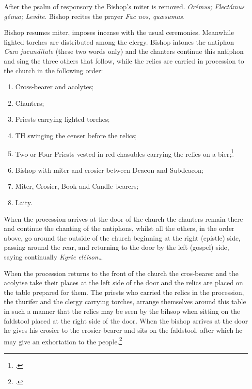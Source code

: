 \documentclass[letterpaper]{report}
\newcommand\src{\textsc{s.r.c.}}
\begin{document}
{\rubric After the psalm of responsory the Bishop's miter is removed. \textit{Orémus;
Flectámus génua; Leváte.} Bishop recites the prayer \textit{Fac nos, qu\ae sumus.}

\rubric Bishop resumes miter, imposes incense with the usual ceremonies.
Meanwhile lighted torches are distributed among the clergy. Bishop intones the
antiphon \textit{Cum jucunditate} (these two words only) and the chanters
continue this antiphon and sing the three others that follow, while the relics
are carried in procession to the church in the following order:

\begin{enumerate}
    \item Cross-bearer and acolytes;
    \item Chanters;
    \item Priests carrying lighted torches;
    \item TH swinging the censer before the relics;
    \item Two or Four Priests vested in red chasubles carrying the relics on a
        bier;\footcite[Instead of these priets the consecrator may carry the
        relics on s salver.][footnote 1, p. 81.]{consecranda}
    \item Bishop with miter and crosier between Deacon and Subdeacon;
    \item Miter, Crosier, Book and Candle bearers;
    \item Laity.
\end{enumerate}

When the procession arrives at the door of the church the chanters remain there
and continue the chanting of the antiphons, whilst all the others, in the order
above, go around the outside of the church beginning at the right (epistle)
side, passing around the rear, and returning to the door by the left (gospel)
side, saying continually \textit{Kyrie eléison\dots}

\rubric When the procession returns to the front of the church the cros-bearer
and the acolytse take their places at the left side of the door and the relics
are placed on the table prepared for them. The priests who carried the relics
in the procession, the thurifer and the clergy carrying torches, arrange
themselves around this table in such a manner that the relics may be seen by
the bihsop when sitting on the faldstool placed at the right side of the door.
When the bishop arrives at the door he gives his crosier to the crosier-bearer
and sits on the faldstool, after which he may give an exhortation to the
people.\footcite[The exhortation here spoken of, the decrees of the Council of
Trent which according to the Pontifical are now read by the archdeacon (any
priest), the address of the Bishop to the founder of the church and the
latter's reply may be omitted. --- \src, May 17, 1890, n. 3729 ad
VIII.][footnote 2, p. 82.]{consecranda}

}
\end{document}
